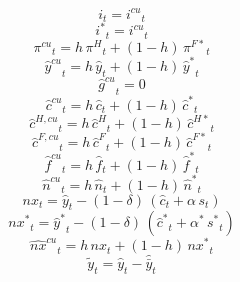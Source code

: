 \begin{dmath}
{{i}}_{t}={{i^{cu}}}_{t}
\end{dmath}
\begin{dmath}
{{i^*}}_{t}={{i^{cu}}}_{t}
\end{dmath}
\begin{dmath}
{{\pi^{cu}}}_{t}={{h}}\, {{\pi^H}}_{t}+\left(1-{{h}}\right)\, {{\pi^{F*}}}_{t}
\end{dmath}
\begin{dmath}
{{\hat y^{cu}}}_{t}={{h}}\, {{\hat y}}_{t}+\left(1-{{h}}\right)\, {{\hat y^*}}_{t}
\end{dmath}
\begin{dmath}
{{\hat g^{cu}}}_{t}=0
\end{dmath}
\begin{dmath}
{{\hat c^{cu}}}_{t}={{h}}\, {{\hat c}}_{t}+\left(1-{{h}}\right)\, {{\hat c^*}}_{t}
\end{dmath}
\begin{dmath}
{{\hat c^{H,cu}}}_{t}={{h}}\, {{\hat c^H}}_{t}+\left(1-{{h}}\right)\, {{\hat c^{H*}}}_{t}
\end{dmath}
\begin{dmath}
{{\hat c^{F,cu}}}_{t}={{h}}\, {{\hat c^F}}_{t}+\left(1-{{h}}\right)\, {{\hat c^{F*}}}_{t}
\end{dmath}
\begin{dmath}
{{\hat f^{cu}}}_{t}={{h}}\, {{\hat f}}_{t}+\left(1-{{h}}\right)\, {{\hat f^*}}_{t}
\end{dmath}
\begin{dmath}
{{\hat n^{cu}}}_{t}={{h}}\, {{\hat n}}_{t}+\left(1-{{h}}\right)\, {{\hat n^*}}_{t}
\end{dmath}
\begin{dmath}
{{nx}}_{t}={{\hat y}}_{t}-\left(1-{{\delta}}\right)\, \left({{\hat c}}_{t}+{{\alpha}}\, {{s}}_{t}\right)
\end{dmath}
\begin{dmath}
{{nx^*}}_{t}={{\hat y^*}}_{t}-\left(1-{{\delta}}\right)\, \left({{\hat c^*}}_{t}+{{\alpha^*}}\, {{s^*}}_{t}\right)
\end{dmath}
\begin{dmath}
{{\hat{nx}^{cu}}}_{t}={{h}}\, {{nx}}_{t}+\left(1-{{h}}\right)\, {{nx^*}}_{t}
\end{dmath}
\begin{dmath}
{{\tilde y}}_{t}={{\hat y}}_{t}-{{\hat {\bar y}}}_{t}
\end{dmath}
